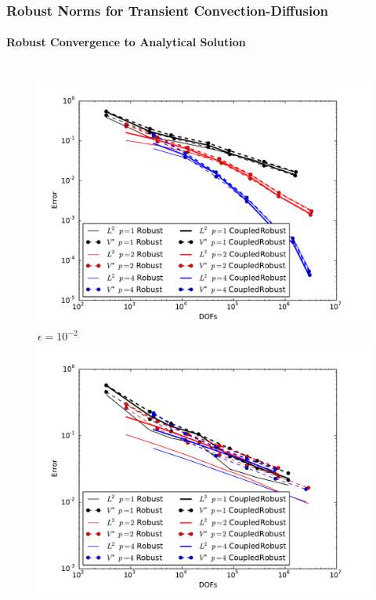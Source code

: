 \documentclass[18pt,xcolor=table]{beamer}
\let\oldfootnotesize\footnotesize
\renewcommand*{\footnotesize}{\oldfootnotesize\tiny}
\begin{document}
\begin{frame}[t]
\frametitle{Robust Norms for Transient Convection-Diffusion}
\framesubtitle{Robust Convergence to Analytical Solution}
\vspace{-6.5ex}
\begin{columns}[t]
\begin{column}{0.4\textwidth}
\begin{figure}[t]
\centering
\includegraphics[width=\textwidth]{Confusion/Robustness/convergence_epsilon=1e-2.pdf}\\
\footnotesize{$\epsilon=10^{-2}$}\\
\includegraphics[width=\textwidth]{Confusion/Robustness/convergence_epsilon=1e-6.pdf}\\

\end{figure}
\end{column}
\end{columns}
\end{frame}
\end{document}
